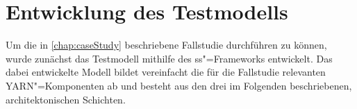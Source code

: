 \chapter{Entwicklung des Testmodells}
\label{chap:model}

Um die in \autoref{chap:caseStudy} beschriebene Fallstudie durchführen zu können, wurde zunächst das Testmodell mithilfe des \ac{ss}"=Frameworks entwickelt.
Das dabei entwickelte Modell bildet vereinfacht die für die Fallstudie relevanten \ac{YARN}"=Komponenten ab und besteht aus den drei im Folgenden beschriebenen, architektonischen Schichten.








